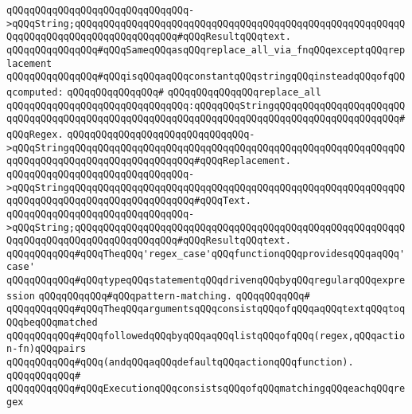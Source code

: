 \verb|qQQqqQQqqQQqqQQqqQQqqQQqqQQqqQQq->qQQqString;qQQqqQQqqQQqqQQqqQQqqQQqqQQqqQQqqQQqqQQqqQQqqQQqqQQqqQQqqQQqqQQqqQQqqQQqqQQqqQQqqQQqqQQq#qQQqResultqQQqtext.|\newline
\newline
\newline
\verb|qQQqqQQqqQQqqQQq#qQQqSameqQQqasqQQqreplace_all_via_fnqQQqexceptqQQqreplacement|\newline
\verb|qQQqqQQqqQQqqQQq#qQQqisqQQqaqQQqconstantqQQqstringqQQqinsteadqQQqofqQQqcomputed:|\newline
\verb|qQQqqQQqqQQqqQQq#|\newline
\verb|qQQqqQQqqQQqqQQqreplace_all|\newline
\verb|qQQqqQQqqQQqqQQqqQQqqQQqqQQqqQQq:qQQqqQQqStringqQQqqQQqqQQqqQQqqQQqqQQqqQQqqQQqqQQqqQQqqQQqqQQqqQQqqQQqqQQqqQQqqQQqqQQqqQQqqQQqqQQqqQQqqQQq#qQQqRegex.|\newline
\verb|qQQqqQQqqQQqqQQqqQQqqQQqqQQqqQQq->qQQqStringqQQqqQQqqQQqqQQqqQQqqQQqqQQqqQQqqQQqqQQqqQQqqQQqqQQqqQQqqQQqqQQqqQQqqQQqqQQqqQQqqQQqqQQqqQQq#qQQqReplacement.|\newline
\verb|qQQqqQQqqQQqqQQqqQQqqQQqqQQqqQQq->qQQqStringqQQqqQQqqQQqqQQqqQQqqQQqqQQqqQQqqQQqqQQqqQQqqQQqqQQqqQQqqQQqqQQqqQQqqQQqqQQqqQQqqQQqqQQqqQQq#qQQqText.|\newline
\verb|qQQqqQQqqQQqqQQqqQQqqQQqqQQqqQQq->qQQqString;qQQqqQQqqQQqqQQqqQQqqQQqqQQqqQQqqQQqqQQqqQQqqQQqqQQqqQQqqQQqqQQqqQQqqQQqqQQqqQQqqQQqqQQq#qQQqResultqQQqtext.|\newline
\newline
\newline
\verb|qQQqqQQqqQQq#qQQqTheqQQq'regex_case'qQQqfunctionqQQqprovidesqQQqaqQQq'case'|\newline
\verb|qQQqqQQqqQQq#qQQqtypeqQQqstatementqQQqdrivenqQQqbyqQQqregularqQQqexpression|\newline
\verb|qQQqqQQqqQQq#qQQqpattern-matching.|\newline
\verb|qQQqqQQqqQQq#|\newline
\verb|qQQqqQQqqQQq#qQQqTheqQQqargumentsqQQqconsistqQQqofqQQqaqQQqtextqQQqtoqQQqbeqQQqmatched|\newline
\verb|qQQqqQQqqQQq#qQQqfollowedqQQqbyqQQqaqQQqlistqQQqofqQQq(regex,qQQqaction-fn)qQQqpairs|\newline
\verb|qQQqqQQqqQQq#qQQq(andqQQqaqQQqdefaultqQQqactionqQQqfunction).|\newline
\verb|qQQqqQQqqQQq#|\newline
\verb|qQQqqQQqqQQq#qQQqExecutionqQQqconsistsqQQqofqQQqmatchingqQQqeachqQQqregex|\newline
